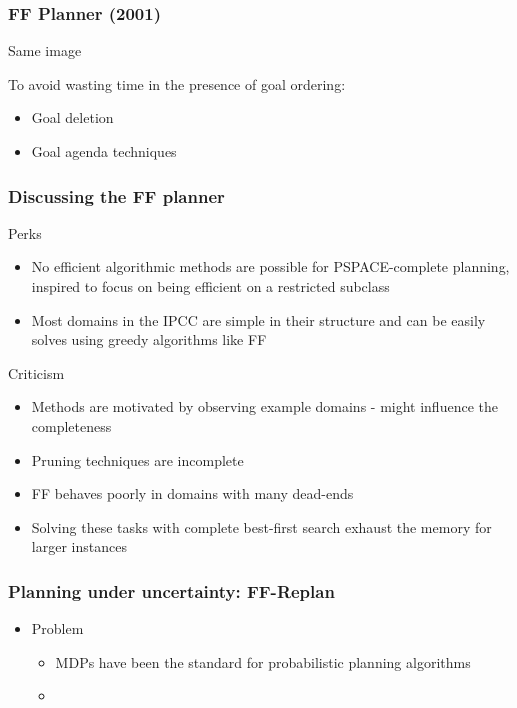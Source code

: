 \documentclass{beamer}
\let\origframetitle=\frametitle
\renewcommand\frametitle[1]{\origframetitle{\textbf{\large{\textrm{#1}}}}}
\begin{document}
\begin{frame}
  \frametitle{FF Planner (2001)}
    Same image

  To avoid wasting time in the presence of goal ordering:

  \begin{itemize}
    \item Goal deletion
    \item Goal agenda techniques
  \end{itemize}

\end{frame}

\begin{frame}
  \frametitle{Discussing the FF planner}

  Perks
  \begin{itemize}
    \item No efficient algorithmic methods are possible for PSPACE-complete planning, inspired to focus on being efficient on a restricted subclass
    \item Most domains in the IPCC are simple in their structure and can be easily solves using greedy algorithms like FF
  \end{itemize}

  Criticism
  \begin{itemize}
    \item Methods are motivated by observing example domains - might influence the completeness
    \item Pruning techniques are incomplete
    \item FF behaves poorly in domains with many dead-ends
    \item Solving these tasks with complete best-first search exhaust the memory for larger instances
  \end{itemize}
\end{frame}


\begin{frame}
  \frametitle{Planning under uncertainty: FF-Replan}

  \begin{itemize}
    \item Problem
      \begin{itemize}
        \item MDPs have been the standard for probabilistic planning algorithms
        \item
      \end{itemize}
  \end{itemize}

\end{frame}
\end{document}
